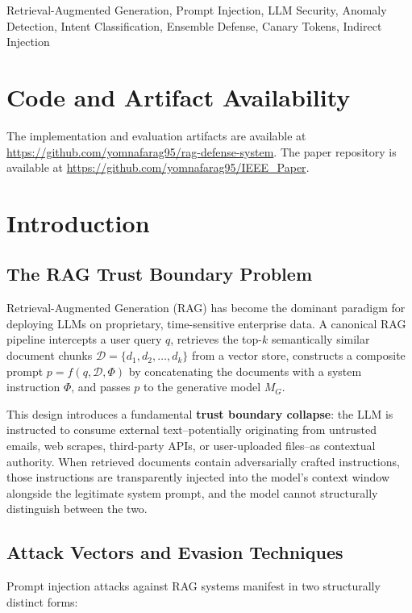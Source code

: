 \documentclass[conference]{IEEEtran}
\begin{document}
\begin{IEEEkeywords}
Retrieval-Augmented Generation, Prompt Injection, LLM Security, Anomaly Detection, Intent Classification, Ensemble Defense, Canary Tokens, Indirect Injection
\end{IEEEkeywords}

\section*{Code and Artifact Availability}
The implementation and evaluation artifacts are available at \url{https://github.com/yomnafarag95/rag-defense-system}. The paper repository is available at \url{https://github.com/yomnafarag95/IEEE_Paper}.

\section{Introduction}

\subsection{The RAG Trust Boundary Problem}

Retrieval-Augmented Generation (RAG) has become the dominant paradigm for deploying LLMs on proprietary, time-sensitive enterprise data. A canonical RAG pipeline intercepts a user query $q$, retrieves the top-$k$ semantically similar document chunks $\mathcal{D} = \{d_1, d_2, \ldots, d_k\}$ from a vector store, constructs a composite prompt $p = f(q, \mathcal{D}, \Phi)$ by concatenating the documents with a system instruction $\Phi$, and passes $p$ to the generative model $M_G$.


This design introduces a fundamental \textbf{trust boundary collapse}: the LLM is instructed to consume external text--potentially originating from untrusted emails, web scrapes, third-party APIs, or user-uploaded files--as contextual authority. When retrieved documents contain adversarially crafted instructions, those instructions are transparently injected into the model's context window alongside the legitimate system prompt, and the model cannot structurally distinguish between the two.


\subsection{Attack Vectors and Evasion Techniques}

Prompt injection attacks against RAG systems manifest in two structurally distinct forms:
\end{document}
